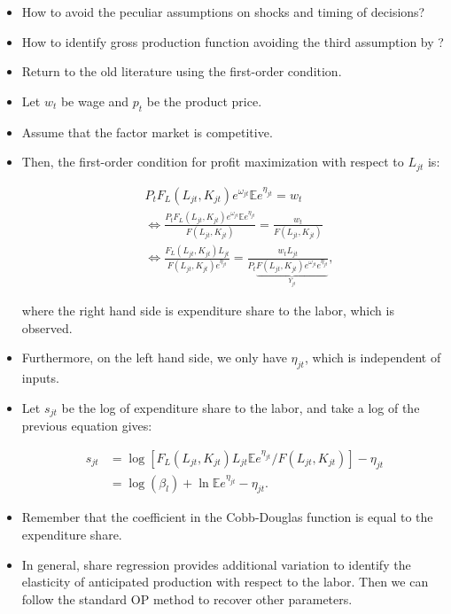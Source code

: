 \documentclass[]{book}
\begin{document}
\begin{itemize}
\item
  How to avoid the peculiar assumptions on shocks and timing of
  decisions?
\item
  How to identify gross production function avoiding the third
  assumption by \citet{Ackerberg2015}?
\item
  Return to the old literature using the first-order condition.
\item
  Let \(w_t\) be wage and \(p_t\) be the product price.
\item
  Assume that the factor market is competitive.
\item
  Then, the first-order condition for profit maximization with respect
  to \(L_{jt}\) is:

  \begin{equation}
  \begin{split}
  &P_t F_L(L_{jt}, K_{jt})e^{\omega_{jt}} \mathbb{E} e^{\eta_{jt}} = w_t\\
  &\Leftrightarrow \frac{P_t F_L(L_{jt}, K_{jt})e^{\omega_{jt}} \mathbb{E} e^{\eta_{jt}}}{F(L_{jt}, K_{jt}) } = \frac{w_t}{F(L_{jt}, K_{jt}) }\\
  &\Leftrightarrow \frac{F_L(L_{jt}, K_{jt}) L_{jt}}{F(L_{jt}, K_{jt})  e^{\eta_{jt}} } = \frac{w_t L_{jt}}{P_t \underbrace{F(L_{jt}, K_{jt}) e^{\omega_{jt}} e^{\eta_{jt}}}_{Y_{jt}} },
  \end{split}
  \end{equation}

  where the right hand side is expenditure share to the labor, which is
  observed.
\item
  Furthermore, on the left hand side, we only have \(\eta_{jt}\), which
  is independent of inputs.
\item
  Let \(s_{jt}\) be the log of expenditure share to the labor, and take
  a log of the previous equation gives:

  \begin{equation}
  \begin{split}
  s_{jt} &= \log [F_L(L_{jt}, K_{jt}) L_{jt} \mathbb{E} e^{\eta_{jt}} / F(L_{jt}, K_{jt})] - \eta_{jt}\\
  & = \log(\beta_l) + \ln \mathbb{E} e^{\eta_{jt}} - \eta_{jt}.
  \end{split}
  \end{equation}
\item
  Remember that the coefficient in the Cobb-Douglas function is equal to
  the expenditure share.
\item
  In general, share regression provides additional variation to identify
  the elasticity of anticipated production with respect to the labor.
  Then we can follow the standard OP method to recover other parameters.
\end{itemize}
\end{document}
